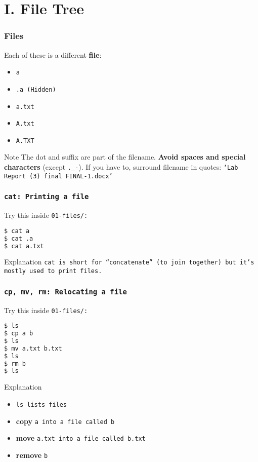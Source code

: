 \section{I. File Tree}
\begin{frame}[fragile]
\frametitle{Files}
Each of these is a different \textbf{file}:
\begin{itemize}
    \item \tt{a}
    \item \tt{.a} (Hidden)
    \item \tt{a.txt}
    \item \tt{A.txt}
    \item \tt{A.TXT}
\end{itemize}

\begin{block}{Note}
    The dot and suffix are part of the filename.
    \newline \newline
    \textbf{Avoid spaces and special characters} (except \verb|._-|).
    If you have to, surround filename in quotes:
    \tt{`Lab Report (3) final FINAL-1.docx'}
\end{block}
\end{frame}

\begin{frame}[fragile]
\frametitle{\tt{cat}: Printing a file}
Try this inside \tt{01-files/}:
\begin{lstlisting}[language=bash]
$ cat a
$ cat .a
$ cat a.txt
\end{lstlisting}
\begin{block}{Explanation}
    \tt{cat} is short for ``concatenate'' (to join together) but it's
    mostly used to print files.
\end{block}
\end{frame}

\begin{frame}[fragile]
\frametitle{\tt{cp, mv, rm}: Relocating a file}
Try this inside \tt{01-files/}:
\begin{lstlisting}[language=bash]
$ ls
$ cp a b
$ ls
$ mv a.txt b.txt
$ ls
$ rm b
$ ls
\end{lstlisting}
\begin{block}{Explanation}
    \begin{itemize}
        \item \tt{ls} lists files
        \item \textbf{copy} \tt{a} into a file called \tt{b}
        \item \textbf{move} \tt{a.txt} into a file called \tt{b.txt}
        \item \textbf{remove} \tt{b}
    \end{itemize}
\end{block}
\end{frame}

